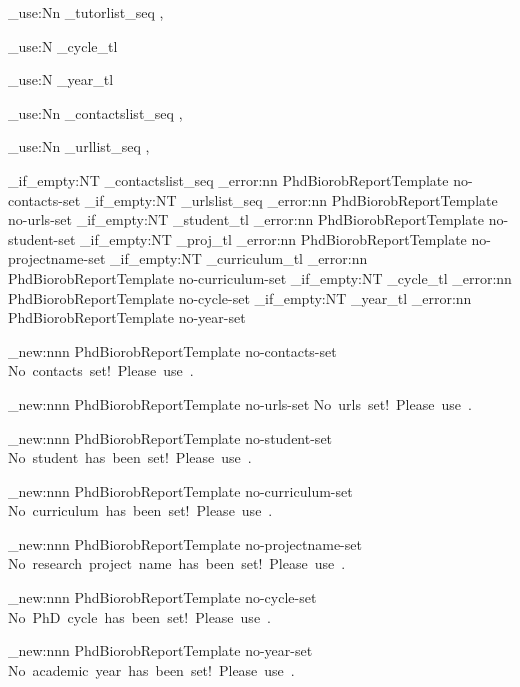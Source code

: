 
\NewDocumentCommand{\getTutorsList}{}
{
	\seq_use:Nn \g_tutorlist_seq {,~}
}

\NewDocumentCommand{\getCycle}{}
{
	\tl_use:N \g_cycle_tl
}

\NewDocumentCommand{\getYear}{}
{
	\tl_use:N \g_year_tl
}

\NewDocumentCommand{\getContactsList}{}
{
	\seq_use:Nn \g_contactslist_seq {,~}
}

\NewDocumentCommand{\getUrlList}{}
{
	\seq_use:Nn \g_urllist_seq {,~}
}

\NewDocumentCommand{\checksetup}{}
{
	\seq_if_empty:NT \g_contactslist_seq
	{
		\msg_error:nn {PhdBiorobReportTemplate} {no-contacts-set}
	}
	\seq_if_empty:NT \g_urlslist_seq
	{
		\msg_error:nn {PhdBiorobReportTemplate} {no-urls-set}
	}
	\tl_if_empty:NT \g_student_tl
	{
		\msg_error:nn {PhdBiorobReportTemplate} {no-student-set}
	}
	\tl_if_empty:NT \g_proj_tl
	{
		\msg_error:nn {PhdBiorobReportTemplate} {no-projectname-set}
	}
	\tl_if_empty:NT \g_curriculum_tl
	{
		\msg_error:nn {PhdBiorobReportTemplate} {no-curriculum-set}
	}
	\tl_if_empty:NT \g_cycle_tl
	{
		\msg_error:nn {PhdBiorobReportTemplate} {no-cycle-set}
	}
	\tl_if_empty:NT \g_year_tl
	{
		\msg_error:nn {PhdBiorobReportTemplate} {no-year-set}
	}
}

\msg_new:nnn {PhdBiorobReportTemplate} {no-contacts-set} {No~contacts~set!~Please~use~\space\string\setContacts\space.}

\msg_new:nnn {PhdBiorobReportTemplate} {no-urls-set} {No~urls~set!~Please~use~\space\string\setUrls\space.}

\msg_new:nnn {PhdBiorobReportTemplate} {no-student-set} { No~student~has~been~set!~Please~use~\string\setStudent.}

\msg_new:nnn {PhdBiorobReportTemplate} {no-curriculum-set} { No~curriculum~has~been~set!~Please~use~\string\setCurriculumName.}

\msg_new:nnn {PhdBiorobReportTemplate} {no-projectname-set} { No~research~project~name~has~been~set!~Please~use~\string\setResearchProjName.}

\msg_new:nnn {PhdBiorobReportTemplate} {no-cycle-set} { No~PhD~cycle~has~been~set!~Please~use~\space\string\setCycle.}

\msg_new:nnn {PhdBiorobReportTemplate} {no-year-set} { No~academic~year~has~been~set!~Please~use~\space\string\setYear.}

